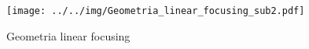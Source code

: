 \begin{subfigure}[h]{\textwidth/\relax}\centering\texttt{[image: ../../img/Geometria\_linear\_focusing\_sub2.pdf]}\caption{Geometria linear focusing}\label{fig:Geometria_linear_focusing}\end{subfigure}%
